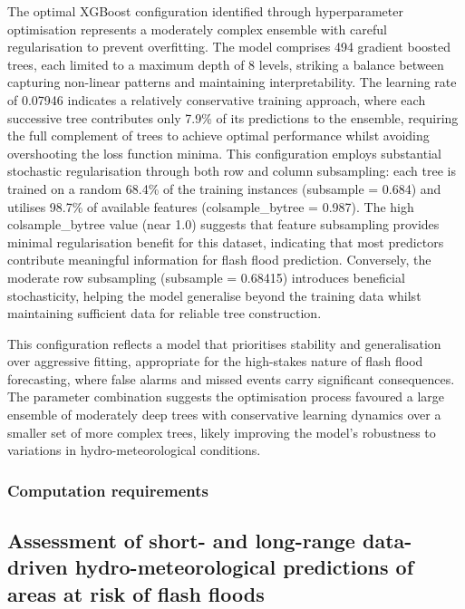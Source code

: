 The optimal XGBoost configuration identified through hyperparameter optimisation represents a moderately complex ensemble with careful regularisation to prevent overfitting. The model comprises 494 gradient boosted trees, each limited to a maximum depth of 8 levels, striking a balance between capturing non-linear patterns and maintaining interpretability. The learning rate of 0.07946 indicates a relatively conservative training approach, where each successive tree contributes only 7.9\% of its predictions to the ensemble, requiring the full complement of trees to achieve optimal performance whilst avoiding overshooting the loss function minima. This configuration employs substantial stochastic regularisation through both row and column subsampling: each tree is trained on a random 68.4\% of the training instances (subsample = 0.684) and utilises 98.7\% of available features (colsample\_bytree = 0.987). The high colsample\_bytree value (near 1.0) suggests that feature subsampling provides minimal regularisation benefit for this dataset, indicating that most predictors contribute meaningful information for flash flood prediction. Conversely, the moderate row subsampling (subsample = 0.68415) introduces beneficial stochasticity, helping the model generalise beyond the training data whilst maintaining sufficient data for reliable tree construction.

This configuration reflects a model that prioritises stability and generalisation over aggressive fitting, appropriate for the high-stakes nature of flash flood forecasting, where false alarms and missed events carry significant consequences. The parameter combination suggests the optimisation process favoured a large ensemble of moderately deep trees with conservative learning dynamics over a smaller set of more complex trees, likely improving the model's robustness to variations in hydro-meteorological conditions.

\subsubsection{Computation requirements}




\subsection{Assessment of short- and long-range data-driven hydro-meteorological predictions of areas at risk of flash floods}

